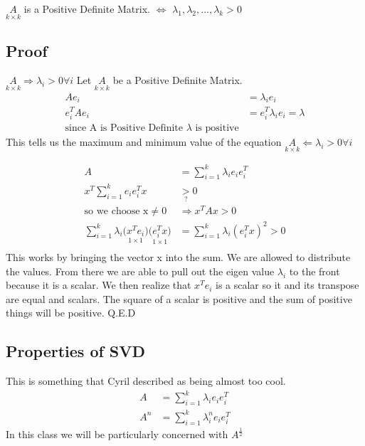 \begin{theorem}
\(\underset{k \times k}{A}\) is a Positive Definite Matrix. $\Leftrightarrow$ $\lambda_1, \lambda_2, ... , \lambda_k > 0$
\end{theorem}

\subsection{Proof}
\(\underset{k \times k}{A} \Rightarrow \lambda_i> 0 \forall	i\)
Let \(\underset{k \times k}{A}\) be a Positive Definite Matrix. 
\begin{align*}
Ae_i &= \lambda_i e_i \\
e_i^TAe_i  &= e_i^T\lambda_ie_i = \lambda \\
\text{since A is Positive Definite } \lambda \text{ is positive}
\end{align*}This tells us the maximum and minimum value of the equation
\(\underset{k \times k}{A} \Leftarrow \lambda_i > 0 \forall	i\)

\begin{align*}
A &= \displaystyle\sum_{i = 1}^{k}\lambda_i e_ie_i^T \\
x^T\displaystyle\sum_{i = 1}^{k}e_ie_i^T x &\underset{?}{>} 0 \\
\text{so we choose x} \neq 0 &\Rightarrow x^TAx > 0 \\
\displaystyle\sum_{i = 1}^{k}\lambda_i \underset{1\times 1}{\big(x^Te_i\big)}\underset{1\times 1}{\big(e_i^Tx\big) }  &= \displaystyle\sum_{i = 1}^{k}\lambda_i (e_i^Tx)^2 > 0\\
\end{align*}
This works by bringing the vector x into the sum. We are allowed to distribute the values. From there we are able to pull out the eigen value $\lambda_i$ to the front  because it is a scalar. We then realize that $x^Te_i$ is a scalar so it and its transpose are equal and scalars. The square of a scalar is positive and the sum of positive things will be positive. Q.E.D

\subsection{Properties of SVD}
This is something that Cyril described as being almost too cool.
\begin{align*}
A &= \displaystyle\sum^{k}_{i=1}\lambda_i e_i e_i^T  \\
A^n &= \displaystyle\sum^{k}_{i=1}\lambda_i ^n e_i e_i^T
\end{align*}
In this class we will be particularly concerned with $A^{\frac{1}{2}}$

